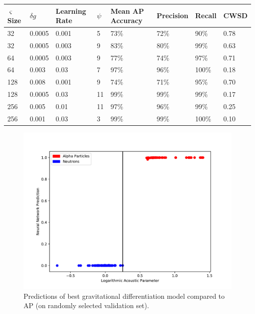 \documentclass[10pt]{article}
\begin{document}
\begin{minipage}{\textwidth}
    \begin{center}
         \label{grav_overview}
        \begin{tabular}{|l|l|l|l|l|l|l|l|}
            \hline
            $\varsigma$ Size & $\delta g$ & Learning Rate & $\psi$ & Mean AP Accuracy & Precision & Recall & CWSD \\
            \hline
            32 & 0.0005 & 0.001 & 5 & 73\% & 72\% & 90\% & 0.78 \\
            \hline
            32 & 0.0005 & 0.003 & 9 & 83\% & 80\% & 99\% & 0.63 \\
            \hline
            64 & 0.0005 & 0.003 & 9 & 77\% & 74\% & 97\% & 0.71 \\
            \hline
            64 & 0.003 & 0.03 & 7 & 97\% & 96\% & 100\% & 0.18 \\
            \hline
            128 & 0.008 & 0.001 & 9 & 74\% & 71\% & 95\% & 0.70 \\
            \hline
            128 & 0.0005 & 0.03 & 11 & 99\% & 99\% & 99\% & 0.17 \\
            \hline
            256 & 0.005 & 0.01 & 11 & 97\% & 96\% & 99\% & 0.25 \\
            \hline
            256 & 0.001 & 0.03 & 3 & 99\% & 99\% & 100\% & 0.10 \\
            \hline
        \end{tabular}
    \end{center}
\end{minipage}

\begin{figure}[H]
    \centering
    \includegraphics[width=\textwidth]{grav_grid_search}
    \caption{\label{grav_grid_search} Predictions of best gravitational differentiation model compared to AP (on randomly selected validation set).}
\end{figure}
\end{document}
